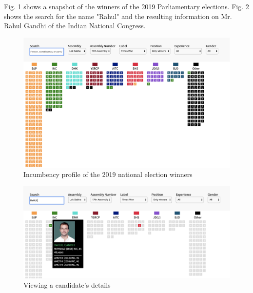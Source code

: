  Fig. \ref{incm_all} shows a snapshot of the winners of the 2019 Parliamentary elections. Fig. \ref{incm_rhl} shows the search for the name "Rahul" and the resulting information on Mr. Rahul Gandhi of the Indian National Congress.
 \begin{figure}
 \centering
 \includegraphics[width=\linewidth]{Incumbency_Profile.png}
 \caption{Incumbency profile of the 2019 national election winners}
 \label{incm_all}
 \end{figure}
 \begin{figure}
 \centering
 \includegraphics[width=\linewidth]{Incumbency_RG.png}
 \caption{Viewing a candidate's details}
 \label{incm_rhl}
 \end{figure}
 